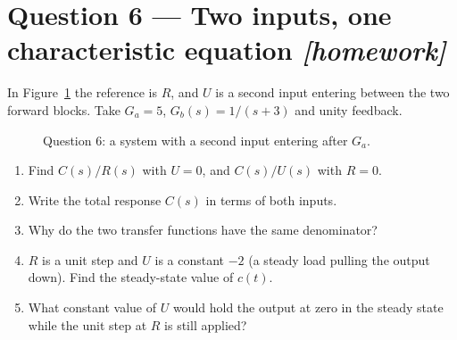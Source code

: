 \documentclass[11pt,a4paper]{article}
\newcommand{\athome}{\hfill{\small\color{fflag}\itshape[homework]}}
\renewcommand{\sumsign}[3]{\node[font=\scriptsize] at ($(#1)+(#2:0.72)$) {$#3$};}
\begin{document}
\section*{Question 6 --- Two inputs, one characteristic equation \athome}

In Figure~\ref{fig:q6} the reference is $R$, and $U$ is a second input entering
between the two forward blocks. Take $G_a=5$, $G_b(s)=1/(s+3)$ and unity
feedback.

\begin{figure}[htbp]
\centering
{}
\caption{Question 6: a system with a second input entering after $G_a$.}
\label{fig:q6}
\end{figure}

\begin{enumerate}[label=(\alph*)]
\item Find $C(s)/R(s)$ with $U=0$, and $C(s)/U(s)$ with $R=0$.
\item Write the total response $C(s)$ in terms of both inputs.
\item Why do the two transfer functions have the same denominator?
\item $R$ is a unit step and $U$ is a constant $-2$ (a steady load pulling the
      output down). Find the steady-state value of $c(t)$.
\item What constant value of $U$ would hold the output at zero in the steady
      state while the unit step at $R$ is still applied?
\end{enumerate}
\end{document}
